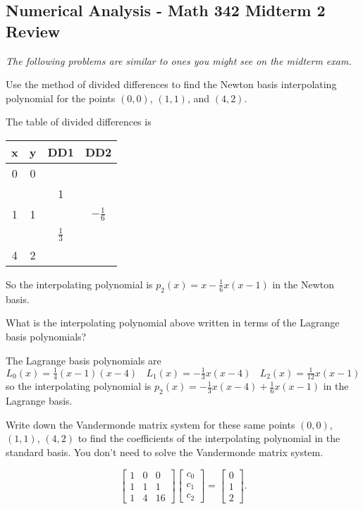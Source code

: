 \documentclass[11pt]{exam}
\begin{document}
\graphicspath{{/home/brian/Dropbox/HSC/Spring16/Math111/}}

\subsection*{Numerical Analysis - Math 342 \hfill Midterm 2 Review}

\textit{The following problems are similar to ones you might see on the midterm exam.}

\begin{questions}

\question Use the method of divided differences to find the Newton basis interpolating polynomial for the points $(0,0)$, $(1,1)$, and $(4,2)$.   

\begin{solution}
The table of divided differences is 

\begin{tabular}{c|ccc}
x & y & DD1 & DD2 \\ \hline
0 & 0 & ~  & ~ \\
~ & ~ & 1  & ~ \\
1 & 1 & ~  & $-\tfrac{1}{6}$ \\
~ & ~ & $\tfrac{1}{3}$  & ~ \\
4 & 2 & ~  & ~ \\
\end{tabular}

\noindent
So the interpolating polynomial is $p_2(x) = x - \tfrac{1}{6}x(x-1)$ in the Newton basis.
\end{solution}
\vfill

\question What is the interpolating polynomial above written in terms of the Lagrange basis polynomials? 
\begin{solution}
The Lagrange basis polynomials are
$$L_0(x) = \tfrac{1}{4}(x-1)(x-4) ~~~~ L_1(x) = -\tfrac{1}{3} x(x-4) ~~~~ L_2(x) = \tfrac{1}{12} x(x-1)$$
so the interpolating polynomial is $p_2(x) = -\tfrac{1}{3} x(x-4) + \tfrac{1}{6}x(x-1)$ in the Lagrange basis.
\end{solution}
\vfill

\question Write down the Vandermonde matrix system for these same points $(0,0)$, $(1,1)$, $(4,2)$ to find the coefficients of the interpolating polynomial in the standard basis. You don't need to solve the Vandermonde matrix system.
\begin{solution}
$$\begin{bmatrix} 1 & 0 & 0 \\ 1 & 1 & 1 \\ 1 & 4 & 16\end{bmatrix} \begin{bmatrix} c_0 \\ c_1 \\ c_2 \end{bmatrix} = \begin{bmatrix} 0 \\ 1 \\ 2 \end{bmatrix}.$$
\end{solution}
\vfill


\end{questions}
\end{document}
